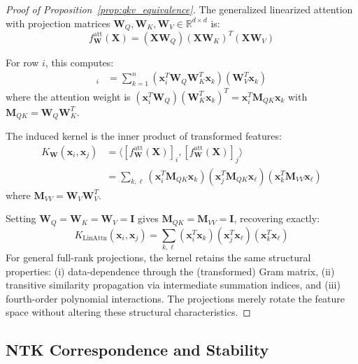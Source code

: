 \documentclass{article}
\theoremstyle{plain}
\theoremstyle{definition}
\theoremstyle{remark}
\newcommand{\R}{\mathbb{R}}
\begin{document}
\begin{proof}[Proof of Proposition~\ref{prop:qkv_equivalence}]
The generalized linearized attention with projection matrices $\mathbf{W}_Q, \mathbf{W}_K, \mathbf{W}_V \in \R^{d \times d}$ is:
\begin{equation}
f^{\text{att}}_{\mathbf{W}}(\mathbf{X}) = (\mathbf{X}\mathbf{W}_Q)(\mathbf{X}\mathbf{W}_K)^T(\mathbf{X}\mathbf{W}_V)
\end{equation}

For row $i$, this computes:
\begin{align}
[f^{\text{att}}_{\mathbf{W}}(\mathbf{X})]_i &= \sum_{k=1}^n (\mathbf{x}_i^T \mathbf{W}_Q \mathbf{W}_K^T \mathbf{x}_k) (\mathbf{W}_V^T \mathbf{x}_k)
\end{align}
where the attention weight is $(\mathbf{x}_i^T \mathbf{W}_Q)(\mathbf{W}_K^T \mathbf{x}_k)^T = \mathbf{x}_i^T \mathbf{M}_{QK} \mathbf{x}_k$ with $\mathbf{M}_{QK} = \mathbf{W}_Q \mathbf{W}_K^T$.

The induced kernel is the inner product of transformed features:
\begin{align}
K_{\mathbf{W}}(\mathbf{x}_i, \mathbf{x}_j) &= \langle [f^{\text{att}}_{\mathbf{W}}(\mathbf{X})]_i, [f^{\text{att}}_{\mathbf{W}}(\mathbf{X})]_j \rangle \nonumber \\
&= \sum_{k,\ell} (\mathbf{x}_i^T \mathbf{M}_{QK} \mathbf{x}_k)(\mathbf{x}_j^T \mathbf{M}_{QK} \mathbf{x}_\ell)(\mathbf{x}_k^T \mathbf{M}_{VV} \mathbf{x}_\ell)
\end{align}
where $\mathbf{M}_{VV} = \mathbf{W}_V \mathbf{W}_V^T$.

Setting $\mathbf{W}_Q = \mathbf{W}_K = \mathbf{W}_V = \mathbf{I}$ gives $\mathbf{M}_{QK} = \mathbf{M}_{VV} = \mathbf{I}$, recovering exactly:
\begin{equation}
K_{\text{LinAttn}}(\mathbf{x}_i, \mathbf{x}_j) = \sum_{k,\ell} (\mathbf{x}_i^T \mathbf{x}_k)(\mathbf{x}_j^T \mathbf{x}_\ell)(\mathbf{x}_k^T \mathbf{x}_\ell)
\end{equation}
For general full-rank projections, the kernel retains the same structural properties: (i) data-dependence through the (transformed) Gram matrix, (ii) transitive similarity propagation via intermediate summation indices, and (iii) fourth-order polynomial interactions. The projections merely rotate the feature space without altering these structural characteristics.
\end{proof}

\subsection{NTK Correspondence and Stability}
\end{document}
